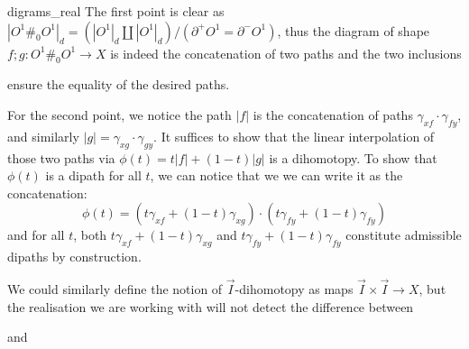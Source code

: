 \begin{lemproof}{digrams_real}
    The first point is clear as \( |O^1 \#_0O^1|_d = (|O^1|_d \coprod |O^1|_d)/(\partial^+ O^1 = \partial^-O^1) \), thus the diagram of shape \( f;g : O^1 \#_0O^1 \to X \) is indeed the concatenation of two paths and the two inclusions 
    \begin{center}
    \end{center}
    ensure the equality of the desired paths.

    For the second point, we notice the path \( |f| \) is the concatenation of paths \( \gamma_{xf}\cdot\gamma_{fy} \), and similarly \( |g| =  \gamma_{xg}\cdot\gamma_{gy} \). It suffices to show that the linear interpolation of those two paths via \( \phi(t) = t|f| + (1-t)|g| \) is a dihomotopy. To show that \( \phi(t) \) is a dipath for all \( t \), we can notice that we we can write it as the concatenation:
    \begin{equation*}
        \phi(t) = (t\gamma_{xf} + (1-t)\gamma_{xg})\cdot (t\gamma_{fy} + (1-t)\gamma_{fy})
    \end{equation*}
    and for all \( t \), both \( t\gamma_{xf} + (1-t)\gamma_{xg} \) and \( t\gamma_{fy} + (1-t)\gamma_{fy} \) constitute admissible dipaths by construction.
\end{lemproof}
We could  similarly define the notion of \( \vec I \)-dihomotopy as maps \( \vec I \times \vec I \to X \), but the realisation we are working with will not detect the difference between 
\begin{center}
\end{center}
and 
\begin{center}
\end{center}
